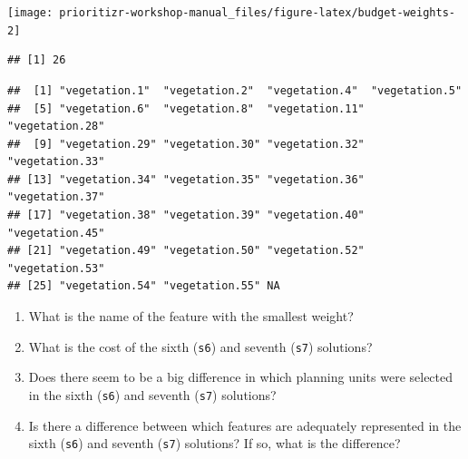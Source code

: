 \documentclass[12pt,]{book}
\newenvironment{Shaded}{\begin{snugshade}}{\end{snugshade}}
\newcommand{\KeywordTok}[1]{\textcolor[rgb]{0.13,0.29,0.53}{\textbf{#1}}}
\newcommand{\DataTypeTok}[1]{\textcolor[rgb]{0.13,0.29,0.53}{#1}}
\newcommand{\FloatTok}[1]{\textcolor[rgb]{0.00,0.00,0.81}{#1}}
\newcommand{\StringTok}[1]{\textcolor[rgb]{0.31,0.60,0.02}{#1}}
\newcommand{\CommentTok}[1]{\textcolor[rgb]{0.56,0.35,0.01}{\textit{#1}}}
\newcommand{\OtherTok}[1]{\textcolor[rgb]{0.56,0.35,0.01}{#1}}
\newcommand{\OperatorTok}[1]{\textcolor[rgb]{0.81,0.36,0.00}{\textbf{#1}}}
\newcommand{\NormalTok}[1]{#1}
\providecommand{\tightlist}{%
  \setlength{\itemsep}{0pt}\setlength{\parskip}{0pt}}
\let\BeginKnitrBlock\begin \let\EndKnitrBlock\end
\begin{document}
\begin{center}\texttt{[image: prioritizr-workshop-manual\_files/figure-latex/budget-weights-2]} \end{center}

\begin{Shaded}
\end{Shaded}

\begin{verbatim}
## [1] 26
\end{verbatim}

\begin{Shaded}
\end{Shaded}

\begin{verbatim}
##  [1] "vegetation.1"  "vegetation.2"  "vegetation.4"  "vegetation.5" 
##  [5] "vegetation.6"  "vegetation.8"  "vegetation.11" "vegetation.28"
##  [9] "vegetation.29" "vegetation.30" "vegetation.32" "vegetation.33"
## [13] "vegetation.34" "vegetation.35" "vegetation.36" "vegetation.37"
## [17] "vegetation.38" "vegetation.39" "vegetation.40" "vegetation.45"
## [21] "vegetation.49" "vegetation.50" "vegetation.52" "vegetation.53"
## [25] "vegetation.54" "vegetation.55" NA
\end{verbatim}

\BeginKnitrBlock{rmdquestion}
\begin{enumerate}
\def\labelenumi{\arabic{enumi}.}
\tightlist
\item
  What is the name of the feature with the smallest weight?
\item
  What is the cost of the sixth (\texttt{s6}) and seventh (\texttt{s7})
  solutions?
\item
  Does there seem to be a big difference in which planning units were
  selected in the sixth (\texttt{s6}) and seventh (\texttt{s7})
  solutions?
\item
  Is there a difference between which features are adequately
  represented in the sixth (\texttt{s6}) and seventh (\texttt{s7})
  solutions? If so, what is the difference?
\end{enumerate}
\EndKnitrBlock{rmdquestion}
\end{document}
